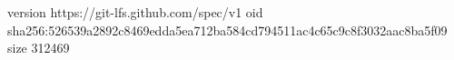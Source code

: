 version https://git-lfs.github.com/spec/v1
oid sha256:526539a2892c8469edda5ea712ba584cd794511ac4c65c9c8f3032aac8ba5f09
size 312469
